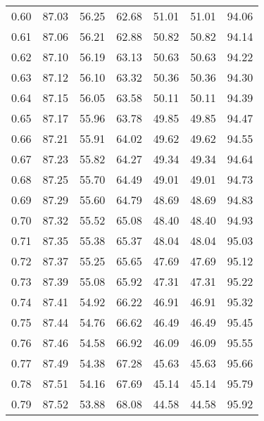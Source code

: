 \begin{tabular}{|c|c|c|c|c|c|c|}
      0.60 &     87.03 &     56.25 &      62.68 &   51.01 &      51.01 &         94.06 \\
      0.61 &     87.06 &     56.21 &      62.88 &   50.82 &      50.82 &         94.14 \\
      0.62 &     87.10 &     56.19 &      63.13 &   50.63 &      50.63 &         94.22 \\
      0.63 &     87.12 &     56.10 &      63.32 &   50.36 &      50.36 &         94.30 \\
      0.64 &     87.15 &     56.05 &      63.58 &   50.11 &      50.11 &         94.39 \\
      0.65 &     87.17 &     55.96 &      63.78 &   49.85 &      49.85 &         94.47 \\
      0.66 &     87.21 &     55.91 &      64.02 &   49.62 &      49.62 &         94.55 \\
      0.67 &     87.23 &     55.82 &      64.27 &   49.34 &      49.34 &         94.64 \\
      0.68 &     87.25 &     55.70 &      64.49 &   49.01 &      49.01 &         94.73 \\
      0.69 &     87.29 &     55.60 &      64.79 &   48.69 &      48.69 &         94.83 \\
      0.70 &     87.32 &     55.52 &      65.08 &   48.40 &      48.40 &         94.93 \\
      0.71 &     87.35 &     55.38 &      65.37 &   48.04 &      48.04 &         95.03 \\
      0.72 &     87.37 &     55.25 &      65.65 &   47.69 &      47.69 &         95.12 \\
      0.73 &     87.39 &     55.08 &      65.92 &   47.31 &      47.31 &         95.22 \\
      0.74 &     87.41 &     54.92 &      66.22 &   46.91 &      46.91 &         95.32 \\
      0.75 &     87.44 &     54.76 &      66.62 &   46.49 &      46.49 &         95.45 \\
      0.76 &     87.46 &     54.58 &      66.92 &   46.09 &      46.09 &         95.55 \\
      0.77 &     87.49 &     54.38 &      67.28 &   45.63 &      45.63 &         95.66 \\
      0.78 &     87.51 &     54.16 &      67.69 &   45.14 &      45.14 &         95.79 \\
      0.79 &     87.52 &     53.88 &      68.08 &   44.58 &      44.58 &         95.92 \\

\end{tabular}
